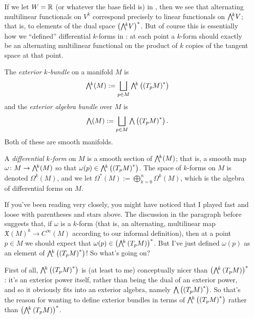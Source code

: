 If we let $W = \mathbb{R}$ (or whatever the base field is) in , then we see that alternating multilinear functionals on $V^k$ correspond precisely to linear functionals on $\ext{k}V$; that is, to elements of the dual space $\left(\ext{k}V\right)^\ast$. But of course this is essentially how we ``defined'' differential $k$-forms in : at each point a $k$-form should exactly be an alternating multilinear functional on the product of $k$ copies of the tangent space at that point.

\begin{definition}\label{def:differential form}
	The \emph{exterior $k$-bundle} on a manifold $M$ is
	\[
		\ext{k}(M) := \bigsqcup_{p \in M} \ext{k}\left(\left(T_pM\right)^\ast\right)
	\]
	and the \emph{exterior algebra bundle} over $M$ is
	\[
		\ext{} (M) := \bigsqcup_{p \in M} \ext{} \left(\left(T_pM\right)^\ast\right).
	\]
	Both of these are smooth manifolds.
	
	A \emph{differential $k$-form} on $M$ is a smooth section of $\ext{k}(M)$; that is, a smooth map $\omega\from M \to \ext{k}(M)$ so that $\omega(p) \in \ext{k}\left(\left(T_pM\right)^\ast\right)$. The space of $k$-forms on $M$ is denoted $\Omega^k(M)$, and we let $\Omega^\ast(M) := \displaystyle \bigoplus_{k=0}^n \Omega^k(M)$, which is the algebra of differential forms on $M$.
\end{definition}

If you've been reading very closely, you might have noticed that I played fast and loose with parentheses and stars above. The discussion in the paragraph before  suggests that, if $\omega$ is a $k$-form (that is, an alternating, multilinear map $\mathfrak{X}(M)^k \to C^\infty(M)$ according to our informal definition), then at a point $p \in M$ we should expect that $\omega(p) \in \left(\ext{k}\left(T_pM\right)\right)^\ast$. But I've just defined $\omega(p)$ as an element of $\ext{k}\left(\left(T_pM\right)^\ast \right)$! So what's going on?

First of all, $\ext{k}\left(\left(T_pM\right)^\ast \right)$ is (at least to me) conceptually nicer than $\left(\ext{k}\left(T_pM\right)\right)^\ast$: it's an exterior power itself, rather than being the dual of an exterior power, and so it obviously fits into an exterior algebra, namely $\ext{}\left(\left(T_pM\right)^\ast\right)$. So that's the reason for wanting to define exterior bundles in terms of $\ext{k}\left(\left(T_pM\right)^\ast\right)$ rather than $\left(\ext{k}\left(T_pM\right)\right)^\ast$.

